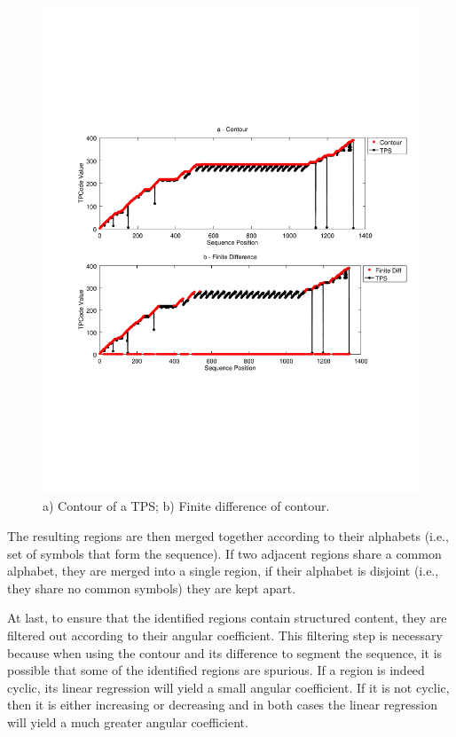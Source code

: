 \begin{figure}[h]
  \centering
     \includegraphics[trim={2.5cm 7.5cm 1cm 6.5cm}, width=\linewidth
     ]{img/contour.pdf}
  \caption{\small{a) Contour of a TPS; b) Finite difference of contour.}}
  \label{fig:contour}
\end{figure}


The resulting regions are then merged together according to their alphabets
(i.e., set of symbols that form the sequence). If two adjacent regions share a
common alphabet, they are merged into a single region, if their alphabet is
disjoint (i.e., they share no common symbols) they are kept apart.

At last, to ensure that the identified regions contain structured content, they
are filtered out according to their angular coefficient. This filtering step is
necessary because when using the contour and its difference to segment the
sequence, it is possible that some of the identified regions are spurious. If a
region is indeed cyclic, its linear regression will yield a small angular
coefficient. If it is not cyclic, then it is either increasing or decreasing and
in both cases the linear regression will yield a much greater angular
coefficient.

